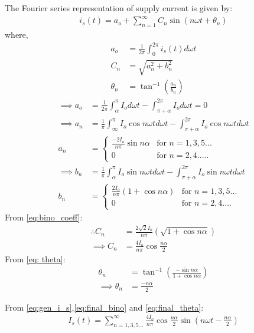 \documentclass[journal,12pt,onecolumn]{IEEEtran}
\theoremstyle{remark}
\begin{document}
The Fourier series representation of supply current is given by:
\begin{align}
    i_s(t) = a_o +\sum_{n=1}^{\infty}C_n\sin({n\omega t} + \theta_n)\label{eq:gen_i_s}
\end{align}
 where,
 \begin{align}
 a_o &= \frac{1}{2\pi} \int_{0}^{2\pi} i_s(t)d\omega t \\
     C_n &= \sqrt{a_n^2 + b_n ^2}\label{eq:bino_coeff}\\
     \theta_n &= \tan^{-1}\left({\frac{a_n}{b_n}}\right)\label{eq: theta}
 \end{align}
\begin{align}
  \implies  a_o &= \frac{1}{2\pi}\int_{\alpha}^{\pi} I_o d\omega t - \int_{\pi + \alpha}^{2\pi} I_o d\omega t = 0\\
 \implies   a_n &= \frac{1}{\pi} \int_{\infty}^{\pi}I_o\cos n\omega t d\omega t - \int_{\pi + \alpha}^{2\pi} I_o\cos{n\omega td\omega t}\\
 a_n &= 
 \begin{cases}
    \frac{-2I_o}{n\pi}\sin{n\alpha} & \text{for } n = 1,3,5...\\
     0 &\text{for } n = 2,4.....
    \end{cases}\\
 \implies   b_n &= \frac{1}{\pi}\int_{\alpha}^{\pi}I_o\sin n\omega t d\omega t - \int_{\pi + \alpha}^{2\pi} I_o\sin{n\omega td\omega t} \\
 b_n &= 
 \begin{cases}
     \frac{2I_o}{n\pi}\left(1 + \cos{n\alpha}\right) &\text{for } n = 1,3,5...\\
     0 &\text{for } n = 2, 4....
    \end{cases}
    \end{align}
From \eqref{eq:bino_coeff}:
\begin{align}
  \therefore  C_n &= \frac{2\sqrt{2}I_o}{n\pi}\left(\sqrt{1 + \cos{n\alpha}}\right)\\
  \implies  C_n &= \frac{4I_o}{n\pi}\cos{\frac{n\alpha}{2}}\label{eq:final_bino}
\end{align}
From \eqref{eq: theta}:
\begin{align}
    \theta_n &= \tan^{-1}\left(\frac{-\sin{n\alpha}}{1 + \cos{n\alpha}}\right)\\
    \implies \theta_n &= \frac{-n\alpha}{2}\label{eq:final_theta}
\end{align}

From \eqref{eq:gen_i_s},\eqref{eq:final_bino} and \eqref{eq:final_theta}:
\begin{align}
I_{s}(t) = \sum_{n=1,3,5...}^{\infty} \frac{4I_{o}}{n\pi}\cos{\frac{n\alpha}{2}}\sin{\left(n\omega t - \frac{n\alpha}{2}\right)}
\end{align}
\end{document}
